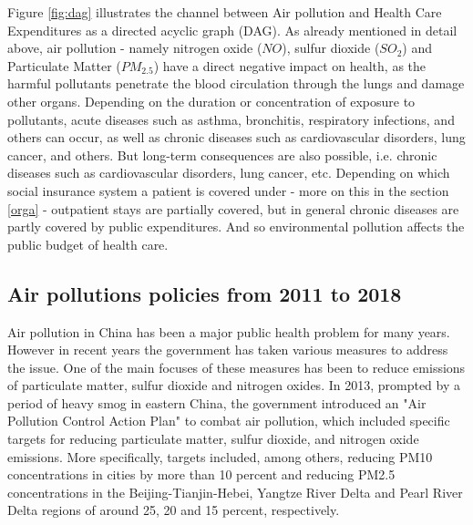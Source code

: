 \documentclass[
]{article}
\begin{document}
Figure \ref{fig:dag} illustrates the channel between Air pollution and Health Care Expenditures as a directed acyclic graph (DAG). As already mentioned in detail above, air pollution - namely nitrogen oxide ($NO$), sulfur dioxide ($SO_2$) and Particulate Matter ($PM_{2.5}$) have a direct negative impact on health, as the harmful pollutants penetrate the blood circulation through the lungs and damage other organs. Depending on the duration or concentration of exposure to pollutants, acute diseases such as asthma, bronchitis, respiratory infections, and others can occur, as well as chronic diseases such as cardiovascular disorders, lung cancer, and others. But long-term consequences are also possible, i.e. chronic diseases such as cardiovascular disorders, lung cancer, etc.  
Depending on which social insurance system a patient is covered under - more on this in the section \ref{orga} - outpatient stays are partially covered, but in general chronic diseases are partly covered by public expenditures. And so environmental pollution affects the public budget of health care. 
	
	
	\subsection{Air pollutions policies from 2011 to 2018}
	
	Air pollution in China has been a major public health problem for many years. However in recent years the government has taken various measures to address the issue. One of the main focuses of these measures has been to reduce emissions of particulate matter, sulfur dioxide and nitrogen oxides. 
	In 2013, prompted by a period of heavy smog in eastern China, the government introduced an "Air Pollution Control Action Plan" to combat air pollution, which included specific targets for reducing particulate matter, sulfur dioxide, and nitrogen oxide emissions. More specifically, targets included, among others, reducing PM10 concentrations in cities by more than 10 percent and reducing PM2.5 concentrations in the Beijing-Tianjin-Hebei, Yangtze River Delta and Pearl River Delta regions of around 25, 20 and 15 percent, respectively. %
	
\end{document}
